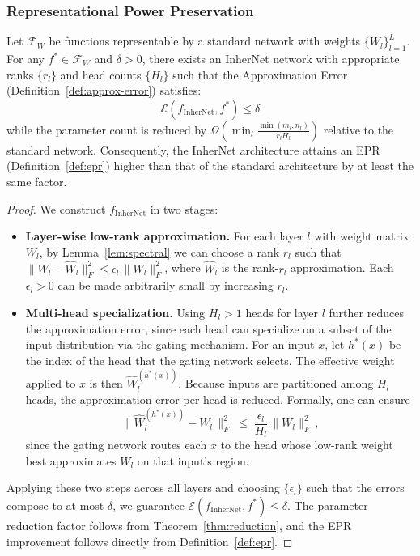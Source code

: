 \documentclass{article} %
\begin{document}
\subsubsection{Representational Power Preservation}

\begin{theorem}
\label{thm:rep-power}
Let $\mathcal{F}_W$ be functions representable by a standard network with weights $\{W_l\}_{l=1}^L$. For any $f^* \in \mathcal{F}_W$ and $\delta > 0$, there exists an InherNet network with appropriate ranks $\{r_l\}$ and head counts $\{H_l\}$ such that the Approximation Error (Definition~\ref{def:approx-error}) satisfies:
\begin{equation}
\mathcal{E}(f_{\text{InherNet}}, f^*) \le \delta
\end{equation}
while the parameter count is reduced by $\Omega(\min_{l} \frac{\min(m_l,n_l)}{r_l H_l})$ relative to the standard network. Consequently, the InherNet architecture attains an EPR (Definition~\ref{def:epr}) higher than that of the standard architecture by at least the same factor.
\end{theorem}

\begin{proof}
We construct $f_{\text{InherNet}}$ in two stages:

\begin{itemize}[leftmargin=*, topsep=2pt, itemsep=2pt]
\item \textbf{Layer-wise low-rank approximation.} For each layer $l$ with weight matrix $W_l$, by Lemma~\ref{lem:spectral} we can choose a rank $r_l$ such that $\|W_l - \hat{W}_l\|_F^2 \le \epsilon_l\,\|W_l\|_F^2$, where $\hat{W}_l$ is the rank-$r_l$ approximation. Each $\epsilon_l > 0$ can be made arbitrarily small by increasing $r_l$. 

\item \textbf{Multi-head specialization.} Using $H_l > 1$ heads for layer $l$ further reduces the approximation error, since each head can specialize on a subset of the input distribution via the gating mechanism. For an input $x$, let $h^*(x)$ be the index of the head that the gating network selects. The effective weight applied to $x$ is then $\hat{W}_l^{(h^*(x))}$. Because inputs are partitioned among $H_l$ heads, the approximation error per head is reduced. Formally, one can ensure 
\begin{equation}
\big\|\,\hat{W}_l^{(h^*(x))} - W_l\,\big\|_F^2 \;\le\; \frac{\epsilon_l}{H_l}\,\|W_l\|_F^2\,,
\end{equation}
since the gating network routes each $x$ to the head whose low-rank weight best approximates $W_l$ on that input's region.
\end{itemize}

Applying these two steps across all layers and choosing $\{\epsilon_l\}$ such that the errors compose to at most $\delta$, we guarantee $\mathcal{E}(f_{\text{InherNet}}, f^*) \le \delta$. The parameter reduction factor follows from Theorem~\ref{thm:reduction}, and the EPR improvement follows directly from Definition~\ref{def:epr}.
\end{proof}
\end{document}
